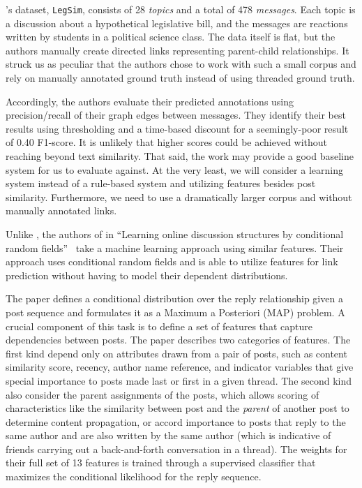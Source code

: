 \documentclass[11pt]{article}
\newcommand{\titlecite}[2]{``#1''~\cite{#2}}
\begin{document}
\cite{Wang2008a}'s dataset, \texttt{LegSim}, consists of 28 \textit{topics} and a total of
478 \textit{messages}. Each topic is a discussion about a hypothetical legislative bill, 
and the messages are reactions written by students in a political science class. 
The data itself is flat, but the authors manually create directed links representing
parent-child relationships. It struck us as peculiar that the authors chose to work
with such a small corpus and rely on manually annotated ground truth instead of using
threaded ground truth.

Accordingly, the authors evaluate their predicted annotations using precision/recall of
their graph edges between messages. They identify their best results using
thresholding and a time-based discount for a seemingly-poor result of 0.40 
F1-score. It is unlikely that higher scores could be achieved without reaching
beyond text similarity. That said, the work may provide a good baseline system
for us to evaluate against. At the very least, we will consider a learning
system instead of a rule-based system and utilizing features besides post
similarity.  Furthermore, we need to use a dramatically larger corpus and without manually
annotated links.

Unlike \cite{Wang2008a}, the authors of in \titlecite{Learning online discussion structures
by conditional random fields}{Wang2011a} take a machine learning approach using
similar features. Their approach uses conditional random
fields and is able to utilize features for link prediction
without having to model their dependent distributions.

The \cite{Wang2011a} paper defines a conditional distribution over the reply
relationship given a post sequence and formulates it as a Maximum a Posteriori
(MAP) problem. A crucial component of this task is to define a set of features
that capture dependencies between posts. The paper describes two categories of
features. The first kind depend only on attributes drawn from a pair
of posts, such as content similarity score, recency, author name reference, and
indicator variables that give special importance to posts made last or first in
a given thread. The second kind also consider the parent assignments of
the posts, which allows scoring of characteristics like the
similarity between  post and the \emph{parent} of another post to determine
content propagation, or accord importance to posts that reply to the same author
and are also written by the same author (which is indicative of friends carrying
out a back-and-forth conversation in a thread). The weights for their full set of
13 features is trained through a supervised classifier that maximizes the
conditional likelihood for the reply sequence.
\end{document}

